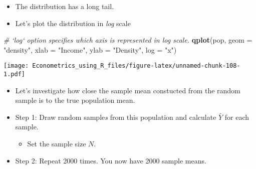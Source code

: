 \documentclass[]{book}
\newenvironment{Shaded}{\begin{snugshade}}{\end{snugshade}}
\newcommand{\CommentTok}[1]{\textcolor[rgb]{0.56,0.35,0.01}{\textit{#1}}}
\newcommand{\DataTypeTok}[1]{\textcolor[rgb]{0.13,0.29,0.53}{#1}}
\newcommand{\KeywordTok}[1]{\textcolor[rgb]{0.13,0.29,0.53}{\textbf{#1}}}
\newcommand{\NormalTok}[1]{#1}
\newcommand{\StringTok}[1]{\textcolor[rgb]{0.31,0.60,0.02}{#1}}
\providecommand{\tightlist}{%
  \setlength{\itemsep}{0pt}\setlength{\parskip}{0pt}}
\begin{document}
\begin{itemize}
\tightlist
\item
  The distribution has a long tail.
\item
  Let's plot the distribution in \emph{log} scale
\end{itemize}

\begin{Shaded}
\begin{Highlighting}[]
\CommentTok{# `log` option specifies which axis is represented in log scale.}
\KeywordTok{qplot}\NormalTok{(pop, }\DataTypeTok{geom =} \StringTok{"density"}\NormalTok{, }
      \DataTypeTok{xlab =} \StringTok{"Income"}\NormalTok{,}
      \DataTypeTok{ylab =} \StringTok{"Density"}\NormalTok{,}
      \DataTypeTok{log =} \StringTok{"x"}\NormalTok{)}
\end{Highlighting}
\end{Shaded}

\texttt{[image: Econometrics\_using\_R\_files/figure-latex/unnamed-chunk-108-1.pdf]}

\begin{itemize}
\tightlist
\item
  Let's investigate how close the sample mean constucted from the random sample is to the true population mean.
\item
  Step 1: Draw random sample\emph{s} from this population and calculate \(\bar{Y}\) for each sample.

  \begin{itemize}
  \tightlist
  \item
    Set the sample size \(N\).
  \end{itemize}
\item
  Step 2: Repeat 2000 times. You now have 2000 sample means.
\end{itemize}
\end{document}
